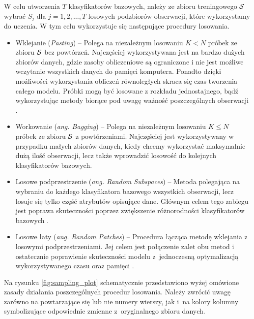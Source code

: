\documentclass[inzynierska]{pwr_wmat_praca_dyplomowa}
\theoremstyle{plain}
\numberwithin{theorem}{chapter}
\theoremstyle{definition}
\numberwithin{theorem}{chapter}
\begin{document}
W celu utworzenia $T$ klasyfikatorów bazowych, należy ze zbioru treningowego $\mathcal{S}$ wybrać $S_j$ dla $j=1,2,\dots,T$ losowych podzbiorów obserwacji, które wykorzystamy do uczenia. W tym celu wykorzystuje się następujące procedury losowania.

\begin{itemize}
	\item Wklejanie (\textit{Pasting}) -- Polega na niezależnym losowaniu $K < N$ próbek ze zbioru $\mathcal{S}$ bez powtórzeń. Najczęściej wykorzystywana jest na bardzo dużych zbiorów danych, gdzie zasoby obliczeniowe są ograniczone i nie jest możliwe wczytanie wszystkich danych do pamięci komputera. Ponadto dzięki możliwości wykorzystania obliczeń równoległych skraca się czas tworzenia całego modelu. Próbki mogą być losowane z rozkładu jednostajnego, bądź wykorzystując metody biorące pod uwagę ważność poszczególnych obserwacji \cite{Pasting}.
	\item Workowanie (\textit{ang. Bagging}) -- Polega na niezależnym losowaniu $K \leq N$ próbek ze zbioru $\mathcal{S}$ z powtórzeniami. Najczęściej jest wykorzystywany w przypadku małych zbiorów danych, kiedy chcemy wykorzystać maksymalnie dużą ilość obserwacji, lecz także wprowadzić losowość do kolejnych klasyfikatorów bazowych.
	\item Losowe podprzestrzenie (\textit{ang. Random Subspaces}) -- Metoda polegająca na wybraniu do każdego klasyfikatora bazowego wszystkich obserwacji, lecz losuje się tylko część atrybutów opisujące dane. Głównym celem tego zabiegu jest poprawa skuteczności poprzez zwiększenie różnorodności klasyfikatorów bazowych \cite{Random_Subspace}.
	\item Losowe łaty (\textit{ang. Random Patches}) -- Procedura łącząca metodę wklejania z losowymi podprzestrzeniami. Jej celem jest połączenie zalet obu metod i ostatecznie poprawienie skuteczności modelu z~jednoczesną optymalizacją wykorzystywanego czasu oraz pamięci \cite{Random_Patches}.
\end{itemize}
Na rysunku \ref{fig:sampling_plot} schematycznie przedstawiono wyżej omówione zasady działania poszczególnych procedur losowania. Należy zwrócić uwagę zarówno na powtarzające się lub nie numery wierszy, jak i~na kolory kolumny symbolizujące odpowiednie zmienne z~oryginalnego zbioru danych.
\end{document}
